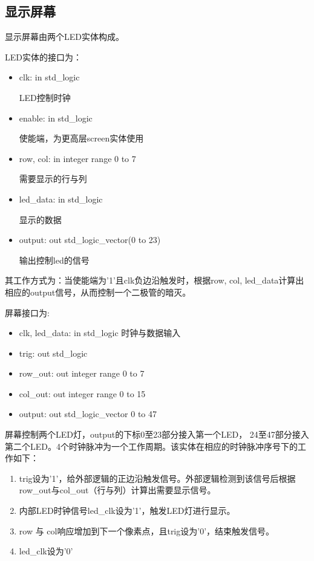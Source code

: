 \documentclass{article}
\begin{document}
\subsection{显示屏幕}
\begin{spacing}{1.62}
显示屏幕由两个LED实体构成。

	LED实体的接口为：
	\begin{itemize}
		\item clk: in std\_logic
			
			LED控制时钟

		\item enable: in std\_logic

			使能端，为更高层screen实体使用

		\item row, col: in integer range 0 to 7

			需要显示的行与列

		\item led\_data: in std\_logic

			显示的数据

		\item output: out std\_logic\_vector(0 to 23)

			输出控制led的信号

	\end{itemize}

	其工作方式为：当使能端为'1'且clk负边沿触发时，根据row, col, led\_data计算出
	相应的output信号，从而控制一个二极管的暗灭。



屏幕接口为: 
\begin{itemize}
	\item clk, led\_data: in std\_logic
		时钟与数据输入
	\item trig: out std\_logic
	\item row\_out: out integer range 0 to 7
	\item col\_out: out integer range 0 to 15
	\item output: out std\_logic\_vector 0 to 47
\end{itemize}

屏幕控制两个LED灯，output的下标0至23部分接入第一个LED，
24至47部分接入第二个LED。4个时钟脉冲为一个工作周期。该实体在相应的时钟脉冲序号下的工作如下：
\begin{enumerate}
	\item trig设为'1'，给外部逻辑的正边沿触发信号。外部逻辑检测到该信号后根据row\_out与col\_out（行与列）计算出需要显示信号。
	\item 内部LED时钟信号led\_clk设为'1'，触发LED灯进行显示。 
	\item row 与 col响应增加到下一个像素点，且trig设为'0'，结束触发信号。 
	\item led\_clk设为'0'
\end{enumerate}

\end{spacing}
\end{document}
